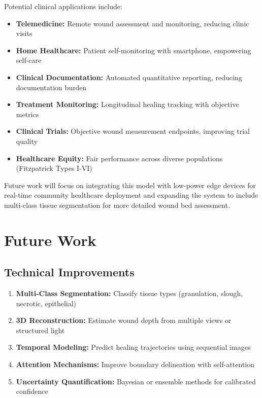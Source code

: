\documentclass[conference]{IEEEtran}
\begin{document}
Potential clinical applications include:
\begin{itemize}
    \item \textbf{Telemedicine:} Remote wound assessment and monitoring, reducing clinic visits
    \item \textbf{Home Healthcare:} Patient self-monitoring with smartphone, empowering self-care
    \item \textbf{Clinical Documentation:} Automated quantitative reporting, reducing documentation burden
    \item \textbf{Treatment Monitoring:} Longitudinal healing tracking with objective metrics
    \item \textbf{Clinical Trials:} Objective wound measurement endpoints, improving trial quality
    \item \textbf{Healthcare Equity:} Fair performance across diverse populations (Fitzpatrick Types I-VI)
\end{itemize}

Future work will focus on integrating this model with low-power edge devices for real-time community healthcare deployment and expanding the system to include multi-class tissue segmentation for more detailed wound bed assessment.

\section{Future Work}

\subsection{Technical Improvements}
\begin{enumerate}
    \item \textbf{Multi-Class Segmentation:} Classify tissue types (granulation, slough, necrotic, epithelial)
    \item \textbf{3D Reconstruction:} Estimate wound depth from multiple views or structured light
    \item \textbf{Temporal Modeling:} Predict healing trajectories using sequential images
    \item \textbf{Attention Mechanisms:} Improve boundary delineation with self-attention
    \item \textbf{Uncertainty Quantification:} Bayesian or ensemble methods for calibrated confidence
\end{enumerate}
\end{document}
